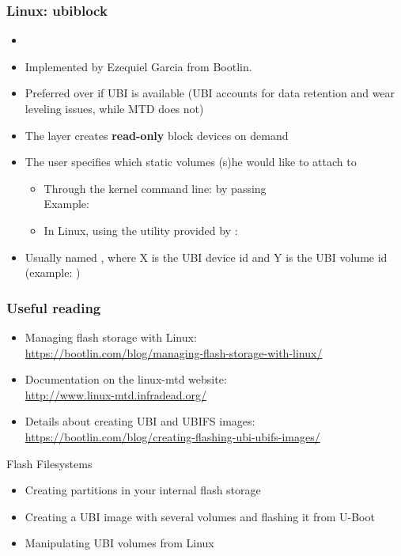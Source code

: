 \begin{frame}
  \frametitle{Linux: ubiblock}
  \begin{itemize}
  \item {}
  \item Implemented by Ezequiel Garcia from Bootlin.
  \item Preferred over  if UBI is available (UBI accounts
    for data retention and wear leveling issues, while MTD does not)
  \item The  layer creates {\bf read-only} block devices
    on demand
  \item The user specifies which static volumes (s)he would like to attach
    to 
    \begin{itemize}
    \item Through the kernel command line: by passing
      \\
      Example: \\
    \item In Linux, using the  utility provided by :
    \end{itemize}
   \item Usually named , where X is the UBI device
     id and Y is the UBI volume id (example: )
  \end{itemize}
\end{frame}

\begin{frame}
  \frametitle{Useful reading}
  \begin{itemize}
  \item Managing flash storage with Linux:\\
    \url{https://bootlin.com/blog/managing-flash-storage-with-linux/}
  \item Documentation on the linux-mtd website:\\
    \url{http://www.linux-mtd.infradead.org/}
  \item Details about creating UBI and UBIFS images:\\
    \url{https://bootlin.com/blog/creating-flashing-ubi-ubifs-images/}
  \end{itemize}
\end{frame}

\setuplabframe
{Flash Filesystems}
{
  \begin{itemize}
  \item Creating partitions in your internal flash storage
  \item Creating a UBI image with several volumes and flashing it from
    U-Boot
  \item Manipulating UBI volumes from Linux
  \end{itemize}
}
